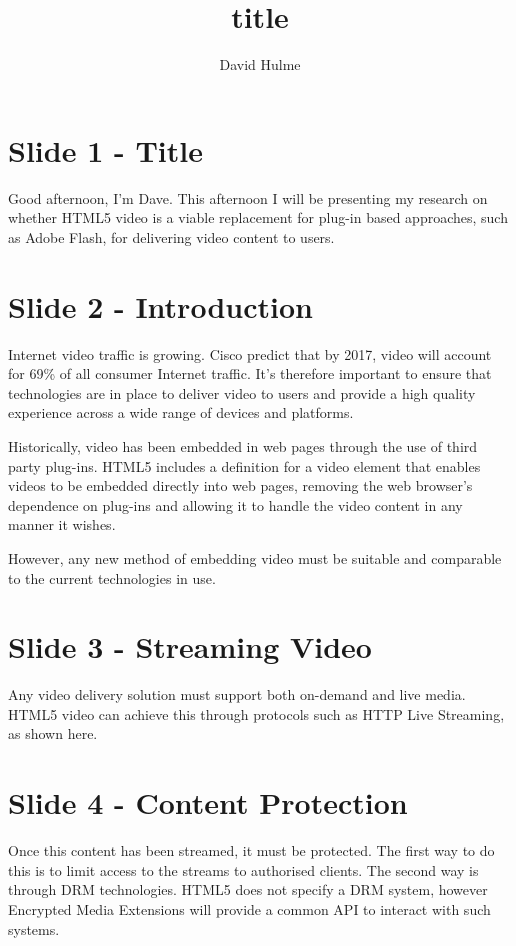 \documentclass[a4paper]{article}
\title{title}
\author{David Hulme}
\begin{document}
\pagestyle{fancy}
\fancyhead{}
\fancyfoot{}
\fancyfoot[RO, RE]{\today}



\section*{Slide 1 - Title}
Good afternoon, I'm Dave. This afternoon I will be presenting my research on whether HTML5 video is a viable replacement for plug-in based approaches, such as Adobe Flash, for delivering video content to users.

\section*{Slide 2 - Introduction}
Internet video traffic is growing. Cisco predict that by 2017, video will account for 69\% of all consumer Internet traffic. It's therefore important to ensure that technologies are in place to deliver video to users and provide a high quality experience across a wide range of devices and platforms.

Historically, video has been embedded in web pages through the use of third party plug-ins. HTML5 includes a definition for a video element that enables videos to be embedded directly into web pages, removing the web browser's dependence on plug-ins and allowing it to handle the video content in any manner it wishes.

However, any new method of embedding video must be suitable and comparable to the current technologies in use.

\section*{Slide 3 - Streaming Video}
Any video delivery solution must support both on-demand and live media. HTML5 video can achieve this through protocols such as HTTP Live Streaming, as shown here.

\section*{Slide 4 - Content Protection}
Once this content has been streamed, it must be protected. The first way to do this is to limit access to the streams to authorised clients. The second way is through DRM technologies. HTML5 does not specify a DRM system, however Encrypted Media Extensions will provide a common API to interact with such systems.
\end{document}

